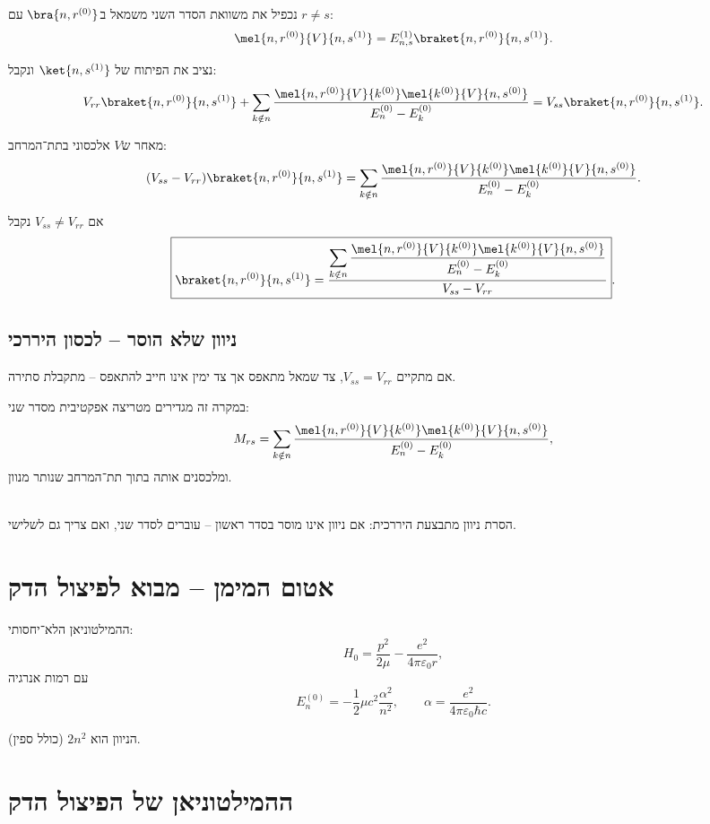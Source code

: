 נכפיל את משוואת הסדר השני משמאל ב$\bra{n,r^{(0)}}$ עם $r \neq s$:
\[
\mel{n,r^{(0)}}{V}{n,s^{(1)}}
=
E_{n,s}^{(1)} \braket{n,r^{(0)}}{n,s^{(1)}}.
\]

נציב את הפיתוח של $\ket{n,s^{(1)}}$ ונקבל:
\[
V_{rr} \braket{n,r^{(0)}}{n,s^{(1)}}
+
\sum_{k\notin n}
\frac{
\mel{n,r^{(0)}}{V}{k^{(0)}}
\mel{k^{(0)}}{V}{n,s^{(0)}}
}{
E_n^{(0)} - E_k^{(0)}
}
=
V_{ss} \braket{n,r^{(0)}}{n,s^{(1)}}.
\]

מאחר ש$V$ אלכסוני בתת־המרחב:
\[
(V_{ss} - V_{rr}) \braket{n,r^{(0)}}{n,s^{(1)}}
=
\sum_{k\notin n}
\frac{
\mel{n,r^{(0)}}{V}{k^{(0)}}
\mel{k^{(0)}}{V}{n,s^{(0)}}
}{
E_n^{(0)} - E_k^{(0)}
}
.
\]

אם $V_{ss} \neq V_{rr}$ נקבל
\[
\boxed{
\braket{n,r^{(0)}}{n,s^{(1)}}
=
\frac{
\displaystyle
\sum_{k\notin n}
\frac{
\mel{n,r^{(0)}}{V}{k^{(0)}}
\mel{k^{(0)}}{V}{n,s^{(0)}}
}{
E_n^{(0)} - E_k^{(0)}
}
}{
V_{ss} - V_{rr}
}
}.
\]



\subsection{ניוון שלא הוסר – לכסון היררכי}

אם מתקיים $V_{ss} = V_{rr}$, צד שמאל מתאפס אך צד ימין אינו חייב להתאפס – מתקבלת סתירה.

במקרה זה מגדירים מטריצה אפקטיבית מסדר שני:
\[
M_{rs}
=
\sum_{k\notin n}
\frac{
\mel{n,r^{(0)}}{V}{k^{(0)}}
\mel{k^{(0)}}{V}{n,s^{(0)}}
}{
E_n^{(0)} - E_k^{(0)}
},
\]
ומלכסנים אותה בתוך תת־המרחב שנותר מנוון.

\begin{resultbox}
\\
הסרת ניוון מתבצעת היררכית:  
אם ניוון אינו מוסר בסדר ראשון – עוברים לסדר שני, ואם צריך גם לשלישי.
\end{resultbox}



\section{אטום המימן – מבוא לפיצול הדק}

ההמילטוניאן הלא־יחסותי:
\[
H_0 = \frac{p^2}{2\mu} - \frac{e^2}{4\pi\varepsilon_0 r},
\]
עם רמות אנרגיה
\[
E_n^{(0)} = -\frac{1}{2}\mu c^2 \frac{\alpha^2}{n^2},
\qquad
\alpha = \frac{e^2}{4\pi\varepsilon_0 \hbar c}.
\]

הניוון הוא $2n^2$ (כולל ספין).



\section{ההמילטוניאן של הפיצול הדק}

